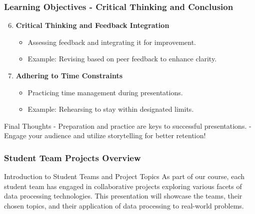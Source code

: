 \documentclass{beamer}
\begin{document}
\begin{frame}[fragile]
    \frametitle{Learning Objectives - Critical Thinking and Conclusion}
    \begin{enumerate}
        \setcounter{enumi}{5}
        \item \textbf{Critical Thinking and Feedback Integration}
        \begin{itemize}
            \item Assessing feedback and integrating it for improvement.
            \item Example: Revising based on peer feedback to enhance clarity.
        \end{itemize}

        \item \textbf{Adhering to Time Constraints}
        \begin{itemize}
            \item Practicing time management during presentations.
            \item Example: Rehearsing to stay within designated limits.
        \end{itemize}
    \end{enumerate}
    
    \begin{block}{Final Thoughts}
        - Preparation and practice are keys to successful presentations.
        - Engage your audience and utilize storytelling for better retention!
    \end{block}
\end{frame}

\begin{frame}[fragile]
    \frametitle{Student Team Projects Overview}
    \begin{block}{Introduction to Student Teams and Project Topics}
        As part of our course, each student team has engaged in collaborative projects exploring various facets of data processing technologies. This presentation will showcase the teams, their chosen topics, and their application of data processing to real-world problems.
    \end{block}
\end{frame}
\end{document}
